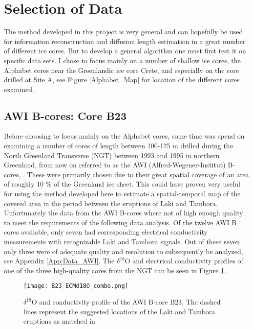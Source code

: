 \documentclass[../../CompleteThesis/Complete_1stDraft]{subfiles}
\begin{document}
	
	\section[Selection][Selection]{Selection of Data}
	\label{Sec:Data_Selection}
	
	The method developed in this project is very general and can hopefully be used for information reconstruction and diffusion length estimation in a great number of different ice cores. But to develop a general algorithm one must first test it on specific data sets. I chose to focus mainly on a number of shallow ice cores, the Alphabet cores near the Greenlandic ice core Crete, and especially on the core drilled at Site A, see Figure \ref{Alphabet_Map} for location of the different cores examined.
	
	\subsection[AWI B-cores]{AWI B-cores: Core B23}
	\label{Subsec:Data_Selection_Bcores}
	Before choosing to focus mainly on the Alphabet cores, some time was spend on examining a number of cores of length between 100-175 m drilled during the North Greenland Transverse (NGT) between 1993 and 1995 in northern Greenland, from now on referred to as the AWI (Alfred-Wegener-Institut) B-cores, \cite[Weissbach et al. 2016]{Weissbach2016}. These were primarily chosen due to their great spatial coverage of an area of roughly 10 \% of the Greenland ice sheet. This could have proven very useful for using the method developed here to estimate a spatial-temporal map of the covered area in the period between the eruptions of Laki and Tambora. Unfortunately the data from the AWI B-cores where not of high enough quality to meet the requirements of the following data analysis. Of the twelve AWI B cores available, only seven had corresponding electrical conductivity measurements with recognizable Laki and Tambora signals. Out of these seven only three were of adequate quality and resolution to subsequently be analyzed, see Appendix \ref{App:Data_AWI}. The $\delta^{18}$O and electrical conductivity profiles of one of the three high-quality cores from the NGT can be seen in Figure \ref{fig:B23_ECMd18O_combo}.
	
	\begin{figure}[h]
		\centering
		\texttt{[image: B23\_ECMd18O\_combo.png]}
		\caption[]{$\delta^{18}$O and conductivity profile of the AWI B-core B23. The dashed lines represent the suggested locations of the Laki and Tambora eruptions as matched in \cite[Weissbach et al. 2016]{Weissbach2016}}
		\label{fig:B23_ECMd18O_combo}
	\end{figure}
	
\end{document}
